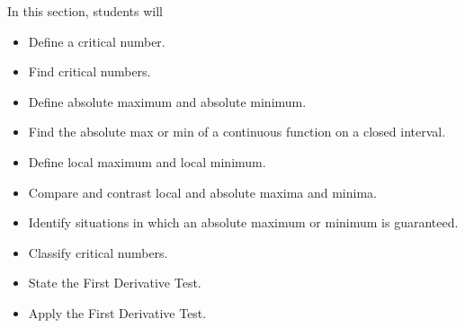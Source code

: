 \documentclass{ximera}
\begin{document}
\begin{sectionOutcomes}
In this section, students will 

\begin{itemize}
\item Define a critical number.
\item Find critical numbers.
\item Define absolute maximum and absolute minimum.
\item Find the absolute max or min of a continuous function on a closed interval.
\item Define local maximum and local minimum.
\item Compare and contrast local and absolute maxima and minima.
\item Identify situations in which an absolute maximum or minimum is guaranteed.
\item Classify critical numbers.
\item State the First Derivative Test.
\item Apply the First Derivative Test.
\end{itemize}
\end{sectionOutcomes}
\end{document}
